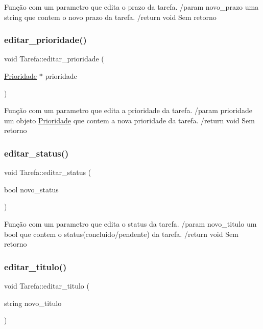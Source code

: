Função com um parametro que edita o prazo da tarefa. /param novo\+\_\+prazo uma string que contem o novo prazo da tarefa. /return void Sem retorno \mbox{\label{classTarefa_a5abdc3ba5dc800ade79d36b9aafd0e7f}} 
\subsubsection{\texorpdfstring{editar\+\_\+prioridade()}{editar\_prioridade()}}
{\footnotesize\ttfamily void Tarefa\+::editar\+\_\+prioridade (\begin{DoxyParamCaption}\item[{\hyperlink{classPrioridade}{Prioridade} $\ast$}]{prioridade }\end{DoxyParamCaption})}

Função com um parametro que edita a prioridade da tarefa. /param prioridade um objeto \hyperlink{classPrioridade}{Prioridade} que contem a nova prioridade da tarefa. /return void Sem retorno \mbox{\label{classTarefa_a23d6b6e297a821fbb6f2aa91ac43fa11}} 
\subsubsection{\texorpdfstring{editar\+\_\+status()}{editar\_status()}}
{\footnotesize\ttfamily void Tarefa\+::editar\+\_\+status (\begin{DoxyParamCaption}\item[{bool}]{novo\+\_\+status }\end{DoxyParamCaption})}

Função com um parametro que edita o status da tarefa. /param novo\+\_\+titulo um bool que contem o status(concluido/pendente) da tarefa. /return void Sem retorno \mbox{\label{classTarefa_af4e2d3743837b146e07b97af8027495d}} 
\subsubsection{\texorpdfstring{editar\+\_\+titulo()}{editar\_titulo()}}
{\footnotesize\ttfamily void Tarefa\+::editar\+\_\+titulo (\begin{DoxyParamCaption}\item[{string}]{novo\+\_\+titulo }\end{DoxyParamCaption})}

